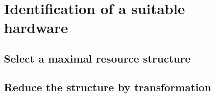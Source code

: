 \documentclass[../main.tex]{subfiles}
\begin{document}
\chapter{Identification of a suitable hardware}

\section{Select a maximal resource structure}

\section{Reduce the structure by transformation}
\end{document}
